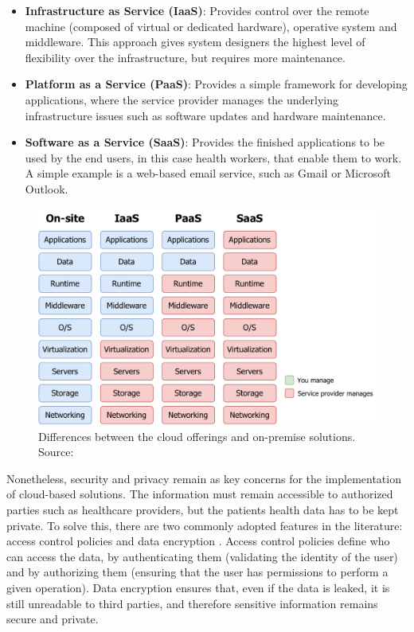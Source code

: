 \begin{itemize}
    \item \textbf{Infrastructure as Service (IaaS)}: Provides control over the remote machine (composed of virtual or dedicated hardware), operative system and middleware. This approach gives system designers the highest level of flexibility over the infrastructure, but requires more maintenance.
    \item \textbf{Platform as a Service (PaaS)}: Provides a simple framework for developing applications, where the service provider manages the underlying infrastructure issues such as software updates and hardware maintenance. 
    \item \textbf{Software as a Service (SaaS)}: Provides the finished applications to be used by the end users, in this case health workers, that enable them to work. A simple example is a web-based email service, such as Gmail or Microsoft Outlook. 
\end{itemize}

\begin{figure}[H]
    \centering
    \includegraphics[width=0.85\linewidth]{images/cloud-services.pdf}
    \caption[Differences between the cloud offerings and on-premise solutions.]{ Differences between the cloud offerings and on-premise solutions. Source: \cite{RedHat2021}}
    \label{fig:differences-between-cloud-services}
\end{figure}


Nonetheless, security and privacy remain as key concerns for the implementation of cloud-based solutions. The information must remain accessible to authorized parties such as healthcare providers, but the patients health data has to be kept private. To solve this, there are two commonly adopted features in the literature: access control policies and data encryption \cite{Baker2017}. Access control policies define who can access the data, by authenticating them (validating the identity of the user) and by authorizing them (ensuring that the user has permissions to perform a given operation). Data encryption ensures that, even if the data is leaked, it is still unreadable to third parties, and therefore sensitive information remains secure and private. \bigskip

